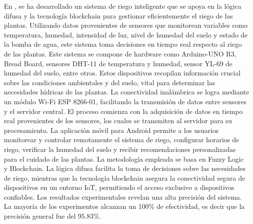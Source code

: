 \bigbreak
En \cite{munir_intelligent_2019}, se ha desarrollado un sistema de riego inteligente que se apoya en la lógica difusa y la tecnología blockchain para gestionar eficientemente el riego de las plantas. Utilizando datos provenientes de sensores que monitorean variables como temperatura, humedad, intensidad de luz, nivel de humedad del suelo y estado de la bomba de agua, este sistema toma decisiones en tiempo real respecto al riego de las plantas. Este sistema se compone de hardware como Arduino-UNO R3, Bread Board, sensores DHT-11 de temperatura y humedad, sensor YL-69 de humedad del suelo, entre otros. Estos dispositivos recopilan información crucial sobre las condiciones ambientales y del suelo, vital para determinar las necesidades hídricas de las plantas. La conectividad inalámbrica se logra mediante un módulo Wi-Fi ESP 8266-01, facilitando la transmisión de datos entre sensores y el servidor central. El proceso comienza con la adquisición de datos en tiempo real provenientes de los sensores, los cuales se transmiten al servidor para su procesamiento. La aplicación móvil para Android permite a los usuarios monitorear y controlar remotamente el sistema de riego, configurar horarios de riego, verificar la humedad del suelo y recibir recomendaciones personalizadas para el cuidado de las plantas. La metodología empleada se basa en Fuzzy Logic y Blockchain. La lógica difusa facilita la toma de decisiones sobre las necesidades de riego, mientras que la tecnología blockchain asegura la conectividad segura de dispositivos en un entorno IoT, permitiendo el acceso exclusivo a dispositivos confiables. Los resultados experimentales revelan una alta precisión del sistema. La mayoría de los experimentos alcanzan un 100\% de efectividad, es decir que la precisión general fue del 95.83\%.

